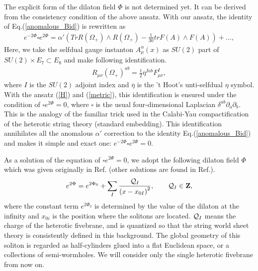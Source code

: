 \documentclass[a4paper,aps, amssymb, preprint, 12pt]{revtex4}
\begin{document}
The explicit form of the dilaton field $\Phi$ is not determined yet.
It can be derived from the consistency condition of the above ansatz.
With our ansatz, the identity of Eq.(\ref{anomalous_Bid}) is rewritten as 
\begin{eqnarray}
e^{-2\Phi}\square e^{2\Phi} = \alpha'\left(TrR(\Omega_{+})\wedge R(\Omega_{+})- \frac{1}{30}trF(A)\wedge F(A)\right) +\ldots,
\end{eqnarray}
Here, we take the selfdual gauge instanton $A_\mu^\alpha(x)$ as $SU(2)$ part of $SU(2)\times E_7 \subset E_8$ and make following identification.
\begin{eqnarray}
R_{\mu\nu}(\Omega_{+})^{ab}=\frac{1}{2}\overline{\eta}^{Iab}F^I_{\mu\nu},
\end{eqnarray}
where $I$ is the $SU(2)$ adjoint index and $\overline{\eta}$ is the 't Hoot's unti-selfdual $\eta$  symbol.
With the ansatz (\ref{H}) and (\ref{metric}), this identification is ensured under the condition of $\square e^{2\Phi}=0$, where $\square$ is the usual four-dimensional Laplacian $\delta^{ab}\partial_a\partial_b$.
This is the analogy of the familiar trick used in the Calabi-Yau compactification of the heterotic string theory (standard embedding)\cite{Calabi-Yau_1, Calabi-Yau_2}.
This identification annihilates all the anomalous $\alpha'$ correction to the identity Eq.(\ref{anomalous_Bid}) and makes it simple and exact one: $e^{-2\Phi}\square e^{2\Phi}=0$.

As a solution of the equation of $\square e^{2\Phi}=0$, we adopt the following dilaton field $\Phi$ which was given originally in Ref.\cite{CHS} (other solutions are found in Ref.\cite{Dilaton_sol_1, Dilaton_sol_2, Dilaton_sol_3}).
\begin{eqnarray}
e^{2\Phi} = e^{2\Phi_0}+\sum_I\frac{{\cal Q}_I}{\left(x-x_{0I}\right)^2},
\qquad {\cal Q}_I \in {\bf Z}\label{Dilaton},
\end{eqnarray}
where the constant term $e^{2\Phi_0}$ is determined by the value of the dilaton at the infinity and $x_{0i}$ is the position where the solitons are located.
${\cal Q}_I$ means the charge of the heterotic fivebrane, and is quantized so that the string world sheet theory is consistently defined in this background\cite{Charge_quantization}.
The global geometry of this soliton is regarded as half-cylinders glued into a flat Euclidean space, or a collections of semi-wormholes.
We will consider only the single heterotic fivebrane from now on.
\end{document}
